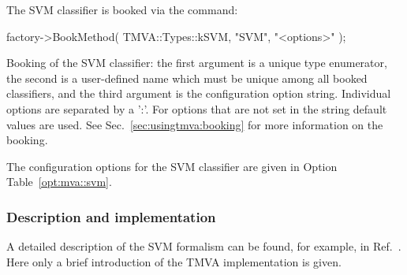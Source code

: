 The SVM classifier is booked via the command:
\begin{codeexample}
\begin{tmvacode}
factory->BookMethod( TMVA::Types::kSVM, "SVM", "<options>" ); 
\end{tmvacode}
\caption[.]{\codeexampleCaptionSize Booking of the SVM classifier: the first  
            argument is a unique type enumerator, the second is a user-defined  
            name which must be unique among all booked classifiers, and the third argument 
            is the configuration option string. Individual options are separated by a ':'. 
            For options that are not set in the string default values are used. 
            See Sec.~\ref{sec:usingtmva:booking} for more information on the booking.}
\end{codeexample}

The configuration options for the SVM classifier are given in Option Table~\ref{opt:mva::svm}.


\begin{option}[t]

\caption[.]{\optionCaptionSize 
     Configuration options reference for MVA method: {\em SVM}.
     Values given are defaults. If predefined categories exist, the default category 
     is marked by a '$\star$'. The options in Option Table~\ref{opt:mva::methodbase} on 
     page~\pageref{opt:mva::methodbase} can also be configured.     
}
\label{opt:mva::svm}
\end{option}

\subsubsection{Description and implementation}

A detailed  description of the SVM formalism can be found, for example,
in Ref.~\cite{Burges}. Here only a brief introduction of the TMVA 
implementation is given. 

